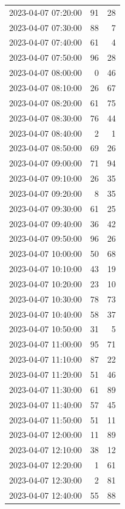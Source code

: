 \documentclass[
  letterpaper,
  DIV=11,
  numbers=noendperiod]{scrartcl}
\begin{document}
\begin{tabular}{lrr}
2023-04-07 07:20:00 &    91 &    28 \\
2023-04-07 07:30:00 &    88 &     7 \\
2023-04-07 07:40:00 &    61 &     4 \\
2023-04-07 07:50:00 &    96 &    28 \\
2023-04-07 08:00:00 &     0 &    46 \\
2023-04-07 08:10:00 &    26 &    67 \\
2023-04-07 08:20:00 &    61 &    75 \\
2023-04-07 08:30:00 &    76 &    44 \\
2023-04-07 08:40:00 &     2 &     1 \\
2023-04-07 08:50:00 &    69 &    26 \\
2023-04-07 09:00:00 &    71 &    94 \\
2023-04-07 09:10:00 &    26 &    35 \\
2023-04-07 09:20:00 &     8 &    35 \\
2023-04-07 09:30:00 &    61 &    25 \\
2023-04-07 09:40:00 &    36 &    42 \\
2023-04-07 09:50:00 &    96 &    26 \\
2023-04-07 10:00:00 &    50 &    68 \\
2023-04-07 10:10:00 &    43 &    19 \\
2023-04-07 10:20:00 &    23 &    10 \\
2023-04-07 10:30:00 &    78 &    73 \\
2023-04-07 10:40:00 &    58 &    37 \\
2023-04-07 10:50:00 &    31 &     5 \\
2023-04-07 11:00:00 &    95 &    71 \\
2023-04-07 11:10:00 &    87 &    22 \\
2023-04-07 11:20:00 &    51 &    46 \\
2023-04-07 11:30:00 &    61 &    89 \\
2023-04-07 11:40:00 &    57 &    45 \\
2023-04-07 11:50:00 &    51 &    11 \\
2023-04-07 12:00:00 &    11 &    89 \\
2023-04-07 12:10:00 &    38 &    12 \\
2023-04-07 12:20:00 &     1 &    61 \\
2023-04-07 12:30:00 &     2 &    81 \\
2023-04-07 12:40:00 &    55 &    88 \\

\end{tabular}
\end{document}
